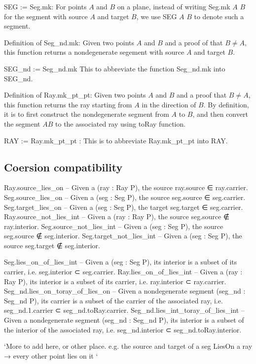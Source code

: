\documentclass[12pt,a4paper]{article}
\begin{document}
SEG := Seg.mk: For points $A$ and $B$ on a plane, instead of writing Seg.mk $A$ $B$ for the segment with source $A$ and target $B$, we use SEG $A$ $B$ to denote such a segment.

Definition of Seg_nd.mk: Given two points $A$ and $B$ and a proof of that $B \neq A$, this function returns a nondegenerate segement with source $A$ and target $B$.

SEG_nd := Seg_nd.mk This to abbreviate the function Seg_nd.mk into SEG_nd.

Definition of Ray.mk_pt_pt: Given two points $A$ and $B$ and a proof that $B \neq A$, this function returns the ray starting from $A$ in the direction of $B$. By definition, it is to first construct the nondegenerate segment from $A$ to $B$, and then convert the segment $AB$ to the associated ray using toRay function.

RAY := Ray.mk_pt_pt : This is to abbreviate Ray.mk_pt_pt into RAY.

\subsection{Coersion compatibility}

    Ray.source_lies_on -- Given a (ray : Ray P), the source ray.source ∈ ray.carrier.
    Seg.source_lies_on -- Given a (seg : Seg P), the source seg.source ∈ seg.carrier.
    Seg.target_lies_on -- Given a (seg : Seg P), the target seg.target ∈ seg.carrier.
    Ray.source_not_lies_int -- Given a (ray : Ray P), the source seg.source ∉ ray.interior.
    Seg.source_not_lies_int -- Given a (seg : Seg P), the source seg.source ∉ seg.interior.
    Seg.target_not_lies_int -- Given a (seg : Seg P), the source seg.target ∉ seg.interior.

    Seg.lies_on_of_lies_int -- Given a (seg : Seg P), its interior is a subset of its carrier, i.e. seg.interior ⊂ seg.carrier.
    Ray.lies_on_of_lies_int -- Given a (ray : Ray P), its interior is a subset of its carrier, i.e. ray.interior ⊂ ray.carrier.
    Seg_nd.lies_on_toray_of_lies_on -- Given a nondegenerate segment (seg_nd : Seg_nd P), its carrier is a subset of the carrier of the associated ray, i.e. seg_nd.1.carrier ⊂ seg_nd.toRay.carrier.
    Seg_nd.lies_int_toray_of_lies_int -- Given a nondegenerate segment (seg_nd : Seg_nd P), its interior is a subset of the interior of the associated ray, i.e. seg_nd.interior ⊂ seg_nd.toRay.interior.

    `More to add here, or other place. e.g. the source and target of a seg LiesOn a ray → every other point lies on it `
\end{document}
